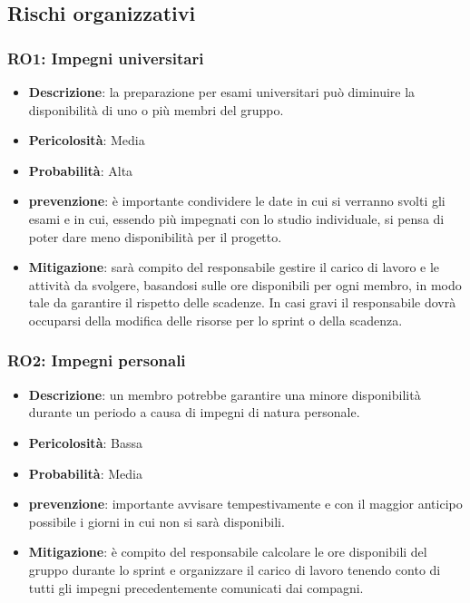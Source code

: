 \documentclass[a4paper, 12pt]{article}
\begin{document}
\subsection{Rischi organizzativi}
\subsubsection{RO1: Impegni universitari}
\begin{itemize}
    \item \textbf{Descrizione}: la preparazione per esami universitari può diminuire la disponibilità di uno o più membri del gruppo.
    \item \textbf{Pericolosità}: Media
    \item \textbf{Probabilità}: Alta
    \item \textbf{prevenzione}: è importante condividere le date in cui si verranno svolti gli esami e in cui, essendo più impegnati 
    con lo studio individuale, si pensa di poter dare meno disponibilità per il progetto.
    \item \textbf{Mitigazione}: sarà compito del responsabile gestire il carico di lavoro e le attività da svolgere, basandosi sulle ore disponibili per ogni membro,
    in modo tale da garantire il rispetto delle scadenze. In casi gravi il responsabile dovrà occuparsi della modifica delle risorse per lo sprint
    o della scadenza.
\end{itemize}
\subsubsection{RO2: Impegni personali}
\begin{itemize}
    \item \textbf{Descrizione}: un membro potrebbe garantire una minore disponibilità durante un periodo a causa di impegni di natura personale.
    \item \textbf{Pericolosità}: Bassa
    \item \textbf{Probabilità}: Media
    \item \textbf{prevenzione}: importante avvisare tempestivamente e con il maggior anticipo possibile i giorni in cui non si sarà disponibili. 
    \item \textbf{Mitigazione}: è compito del responsabile calcolare le ore disponibili del gruppo durante lo sprint e organizzare il carico di lavoro tenendo conto di 
    tutti gli impegni precedentemente comunicati dai compagni. 
\end{itemize}
\end{document}
